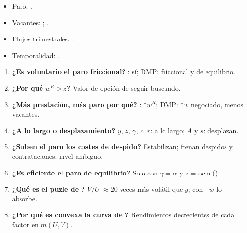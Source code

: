 \documentclass{article}
\begin{document}
\begin{columnas}
\anexorepaso
{}
\begin{itemize}
\item Paro: .
\item Vacantes: ; .
\item Flujos trimestrales: .
\item Temporalidad: .
\end{itemize}
\begin{enumerate}
\item \textbf{¿Es voluntario el paro friccional?} : sí; DMP: friccional y de equilibrio.
\item \textbf{¿Por qué $w^R>z$?} Valor de opción de seguir buscando.
\item \textbf{¿Más prestación, más paro por qué?} : ↑$w^R$; DMP: ↑$w$ negociado, menos vacantes.
\item \textbf{¿A lo largo o desplazamiento?} $y$, $z$, $\gamma$, $c$, $r$: a lo largo; $A$ y $s$: desplazan.
\item \textbf{¿Suben el paro los costes de despido?} Estabilizan; frenan despidos y contrataciones: nivel ambiguo.
\item \textbf{¿Es eficiente el paro de equilibrio?} Solo con $\gamma=\alpha$ y $z$ = ocio ().
\item \textbf{¿Qué es el puzle de ?} $V/U$ $\approx20$ veces más volátil que $y$; con , $w$ lo absorbe.
\item \textbf{¿Por qué es convexa la curva de ?} Rendimientos decrecientes de cada factor en $m(U,V)$.
\end{enumerate}

\end{columnas}
\end{document}
